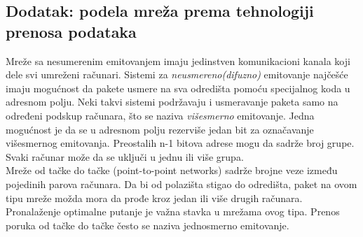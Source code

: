 \documentclass{article} %
\begin{document}
\subsection{Dodatak: podela mreža prema tehnologiji prenosa podataka}
Mreže sa nesumerenim emitovanjem imaju jedinstven komunikacioni kanala koji dele svi umreženi računari. Sistemi  za \textit{neusmereno(difuzno)} emitovanje najčešće imaju mogućnost da pakete usmere na sva odredišta pomoću specijalnog koda u adresnom polju. Neki takvi sistemi podržavaju i usmeravanje paketa samo na određeni podskup računara, što se naziva   \textit{višesmerno} emitovanje. Jedna mogućnost je da se u adresnom polju rezerviše jedan bit za označavanje višesmernog emitovanja. Preostalih n-1 bitova adrese mogu da sadrže broj grupe. Svaki računar može da se uključi u jednu ili više grupa. \\
Mreže od tačke do tačke (point-to-point networks) sadrže brojne veze između pojedinih parova računara. Da bi od polazišta stigao do odredišta, paket na ovom tipu mreže možda mora da prođe kroz jedan ili više drugih računara. Pronalaženje optimalne putanje je važna stavka u mrežama ovog tipa. Prenos poruka od tačke do tačke često se naziva jednosmerno emitovanje.
\end{document}
